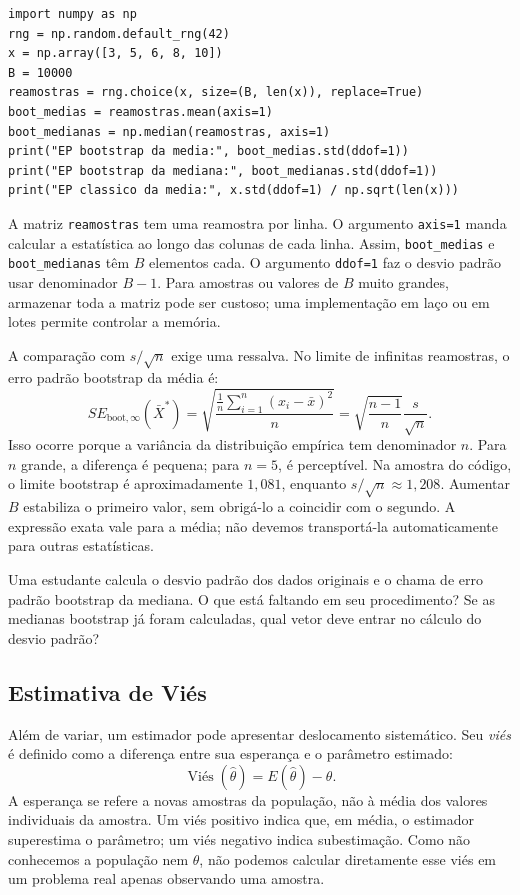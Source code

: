 \documentclass[12pt,a4paper]{article}
\begin{document}
\begin{lstlisting}[caption={Erro padrão bootstrap da média e da mediana.},label={lst:ep}]
import numpy as np
rng = np.random.default_rng(42)
x = np.array([3, 5, 6, 8, 10])
B = 10000
reamostras = rng.choice(x, size=(B, len(x)), replace=True)
boot_medias = reamostras.mean(axis=1)
boot_medianas = np.median(reamostras, axis=1)
print("EP bootstrap da media:", boot_medias.std(ddof=1))
print("EP bootstrap da mediana:", boot_medianas.std(ddof=1))
print("EP classico da media:", x.std(ddof=1) / np.sqrt(len(x)))
\end{lstlisting}
A matriz \texttt{reamostras} tem uma reamostra por linha. O argumento \texttt{axis=1} manda calcular a estatística ao longo das colunas de cada linha. Assim, \texttt{boot\_medias} e \texttt{boot\_medianas} têm $B$ elementos cada. O argumento \texttt{ddof=1} faz o desvio padrão usar denominador $B-1$. Para amostras ou valores de $B$ muito grandes, armazenar toda a matriz pode ser custoso; uma implementação em laço ou em lotes permite controlar a memória.

A comparação com $s/\sqrt n$ exige uma ressalva. No limite de infinitas reamostras, o erro padrão bootstrap da média é:
\[
SE_{\mathrm{boot},\infty}(\bar X^*)=
\sqrt{\frac{\frac1n\sum_{i=1}^n(x_i-\bar x)^2}{n}}
=\sqrt{\frac{n-1}{n}}\frac{s}{\sqrt n}.
\]
Isso ocorre porque a variância da distribuição empírica tem denominador $n$. Para $n$ grande, a diferença é pequena; para $n=5$, é perceptível. Na amostra do código, o limite bootstrap é aproximadamente $1{,}081$, enquanto $s/\sqrt n\approx1{,}208$. Aumentar $B$ estabiliza o primeiro valor, sem obrigá-lo a coincidir com o segundo. A expressão exata vale para a média; não devemos transportá-la automaticamente para outras estatísticas.

\begin{perguntabox}
Uma estudante calcula o desvio padrão dos dados originais e o chama de erro padrão bootstrap da mediana. O que está faltando em seu procedimento? Se as medianas bootstrap já foram calculadas, qual vetor deve entrar no cálculo do desvio padrão?
\end{perguntabox}

\subsection{Estimativa de Viés}
\label{subsec:vies}
Além de variar, um estimador pode apresentar deslocamento sistemático. Seu \emph{viés} é definido como a diferença entre sua esperança e o parâmetro estimado:
\[
\operatorname{Viés}(\hat\theta)=E(\hat\theta)-\theta.
\]
A esperança se refere a novas amostras da população, não à média dos valores individuais da amostra. Um viés positivo indica que, em média, o estimador superestima o parâmetro; um viés negativo indica subestimação. Como não conhecemos a população nem $\theta$, não podemos calcular diretamente esse viés em um problema real apenas observando uma amostra.
\end{document}
